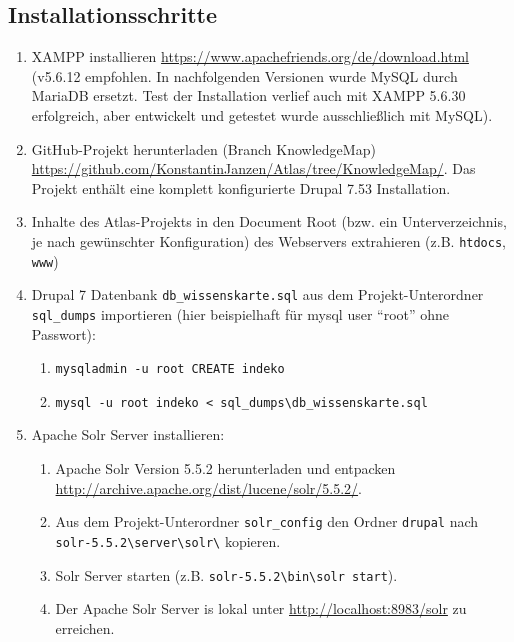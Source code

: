 \subsection{Installationsschritte}
\begin{enumerate}
	\item XAMPP installieren \url{https://www.apachefriends.org/de/download.html} (v5.6.12 empfohlen. In nachfolgenden Versionen wurde MySQL durch MariaDB ersetzt. Test der Installation verlief auch mit XAMPP 5.6.30 erfolgreich, aber entwickelt und getestet wurde ausschließlich mit MySQL).
	
	\item GitHub-Projekt herunterladen (Branch KnowledgeMap) \url{https://github.com/KonstantinJanzen/Atlas/tree/KnowledgeMap/}.
	Das Projekt enthält eine komplett konfigurierte Drupal 7.53 Installation.
	
	\item Inhalte des Atlas-Projekts in den Document Root (bzw. ein Unterverzeichnis, je nach gewünschter Konfiguration) des Webservers extrahieren (z.B. \lstinline|htdocs|, \lstinline|www|)
	
	\item Drupal 7 Datenbank \lstinline|db_wissenskarte.sql| aus dem Projekt-Unterordner \lstinline|sql_dumps| importieren (hier beispielhaft für mysql user \enquote{root} ohne Passwort):
	\begin{enumerate}
		\item \lstinline|mysqladmin -u root CREATE indeko|
		
		\item \lstinline|mysql -u root indeko < sql_dumps\db_wissenskarte.sql|
	\end{enumerate}
	
	\item Apache Solr Server installieren:
	\begin{enumerate}
		\item Apache Solr Version 5.5.2 herunterladen und entpacken \url{http://archive.apache.org/dist/lucene/solr/5.5.2/}.
		
		\item Aus dem Projekt-Unterordner \lstinline|solr_config| den Ordner \lstinline|drupal| nach \lstinline|solr-5.5.2\server\solr\| kopieren.
		
		\item Solr Server starten (z.B. \lstinline|solr-5.5.2\bin\solr start|).
		\item Der Apache Solr Server is lokal unter \url{http://localhost:8983/solr} zu erreichen.
	\end{enumerate}
	

\end{enumerate}
